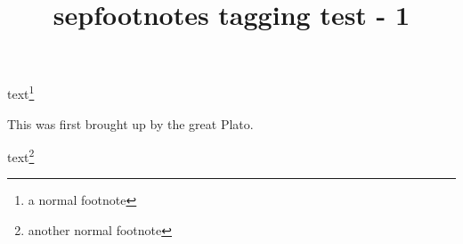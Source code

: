 \documentclass{article}
\title{sepfootnotes tagging test - 1}
\begin{document}
text\footnote{a normal footnote}

This was first brought up by the great Plato.

text\footnote{another normal footnote}
\end{document}
